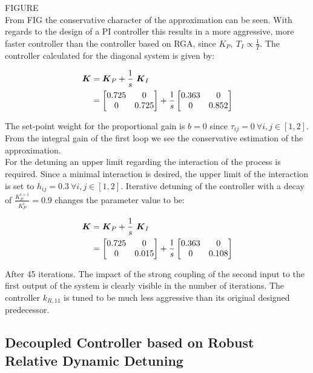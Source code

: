 FIGURE\\

From FIG the conservative character of the approximation can be seen. With regards to the design of a PI controller this results in a more aggressive, more faster controller than the controller based on RGA, since $K_P,~T_I \propto \frac{1}{T}$. The controller calculated for the diagonal system is given by:

\begin{align}
\mbox{\boldmath$K$} &= \mbox{\boldmath$K$}_P + \frac{1}{s}~ \mbox{\boldmath$K$}_I\\
&= \begin{bmatrix}
0.725 & 0 \\
0 & 0.725
\end{bmatrix}
+ \frac{1}{s}\begin{bmatrix}
0.363 & 0 \\
0 & 0.852
\end{bmatrix}
\end{align}

 The set-point weight for the proportional gain is $b = 0$ since $\tau_{ij} = 0 ~\forall i,j \in [1,2]$. From the integral gain of the first loop we see the conservative estimation of the approximation.\\

 For the detuning an upper limit regarding the interaction of the process is required. Since a minimal interaction is desired, the upper limit of the interaction is set to $h_{ij} = 0.3 ~ \forall i,j \in [1,2]$. Iterative detuning of the controller with a decay of $\frac{K_P^{i+1}}{K_P^{i}} = 0.9 $ changes the parameter value to be:

\begin{align}
\mbox{\boldmath$K$} &= \mbox{\boldmath$K$}_P + \frac{1}{s}~ \mbox{\boldmath$K$}_I\\
&= \begin{bmatrix}
0.725 & 0 \\
0 & 0.015
\end{bmatrix}
+ \frac{1}{s}\begin{bmatrix}
0.363 & 0 \\
0 & 0.108
\end{bmatrix}
\end{align}

After 45 iterations. The impact of the strong coupling of the second input to the first output of the system is clearly visible in the number of iterations. The controller $k_{R,11}$ is tuned to be much less aggressive than its original designed predecessor.


\subsection{Decoupled Controller based on Robust Relative Dynamic Detuning}
\label{c:fotd:s:rosenbrock:ss:modifiedastr}

